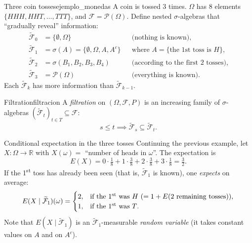 \documentclass[11pt, a4paper]{article}
\begin{document}
\begin{ejemplo}{Three coin tosses}{ejemplo_monedas}
A coin is tossed 3 times. $\Omega$ has 8 elements $\{HHH, HHT, \dots, TTT\}$, and $\mathcal{F}
= \mathcal{P}(\Omega)$. Define nested $\sigma$-algebras that ``gradually reveal''
information:
\begin{align*}
\widetilde{\mathcal{F}}_0 &= \{\emptyset, \Omega\} && \text{(nothing is known)}, \\
\widetilde{\mathcal{F}}_1 &= \sigma(A) = \{\emptyset, \Omega, A, A^c\} && \text{where } A
= \{\text{the 1st toss is }H\}, \\
\widetilde{\mathcal{F}}_2 &= \sigma(B_1, B_2, B_3, B_4) && \text{(according to the first 2 tosses)}, \\
\widetilde{\mathcal{F}}_3 &= \mathcal{P}(\Omega) && \text{(everything is known)}.
\end{align*}
Each $\widetilde{\mathcal{F}}_k$ has more information than $\widetilde{\mathcal{F}}_{k-1}$.
\end{ejemplo}

\begin{definicion}{Filtration}{filtracion}
A \emph{filtration} on $(\Omega, \mathcal{F}, P)$ is an increasing family of
$\sigma$-algebras $(\widetilde{\mathcal{F}}_t)_{t \in T} \subseteq \mathcal{F}$:
$$ s \le t \implies \widetilde{\mathcal{F}}_s \subseteq \widetilde{\mathcal{F}}_t. $$
\end{definicion}

\begin{ejemplo}{Conditional expectation in the three tosses}{}
Continuing the previous example, let $X: \Omega \to \mathbb{R}$ with $X(\omega) = $ ``number of
heads in $\omega$''. The expectation is
$$ E(X) = 0 \cdot \tfrac{1}{8} + 1 \cdot \tfrac{3}{8} + 2 \cdot \tfrac{3}{8} + 3 \cdot \tfrac{1}{8}
= \tfrac{3}{2}. $$
If the 1\textsuperscript{st} toss has already been seen (that is, $\widetilde{\mathcal{F}}_1$ is known),
one \emph{expects} on average:
$$ E(X \mid \widetilde{\mathcal{F}}_1)(\omega) = \begin{cases}
2, & \text{if the 1\textsuperscript{st} was $H$} \ (= 1 + E(\text{2 remaining tosses})), \\
1, & \text{if the 1\textsuperscript{st} was $T$}.
\end{cases} $$
Note that $E(X \mid \widetilde{\mathcal{F}}_1)$ is an $\widetilde{\mathcal{F}}_1$-measurable
\emph{random variable} (it takes constant values on $A$ and on $A^c$).
\end{ejemplo}
\end{document}
